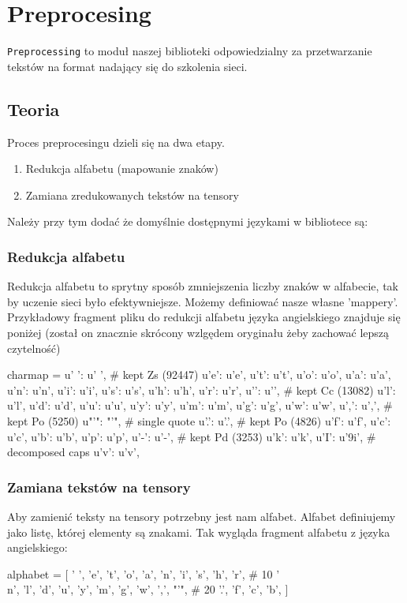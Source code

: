 \newpage
\section{Preprocesing}

\texttt{Preprocessing} to moduł naszej biblioteki odpowiedzialny za przetwarzanie tekstów na format
nadający się do szkolenia sieci. 

\subsection{Teoria}

Proces preprocesingu dzieli się na dwa etapy.
\begin{enumerate}
	\item Redukcja alfabetu (mapowanie znaków)
	\item Zamiana zredukowanych tekstów na tensory
\end{enumerate}

Należy przy tym dodać że domyślnie dostępnymi językami w bibliotece są:
\languages 


\subsubsection{Redukcja alfabetu}
Redukcja alfabetu to sprytny sposób zmniejszenia liczby znaków w alfabecie, tak by uczenie sieci było
efektywniejsze. Możemy definiować nasze własne 'mappery'. Przykładowy fragment pliku do redukcji alfabetu języka
angielskiego znajduje się poniżej (został on znacznie skrócony wzlgędem oryginału żeby zachować lepszą
czytelność)

\begin{python}
charmap = {
    u' ': u' ',                 # kept Zs (92447)
    u'e': u'e',
    u't': u't',
    u'o': u'o',
    u'a': u'a',
    u'n': u'n',
    u'i': u'i',
    u's': u's',
    u'h': u'h',
    u'r': u'r',
    u'\n': u'\n',               # kept Cc (13082)
    u'l': u'l',
    u'd': u'd',
    u'u': u'u',
    u'y': u'y',
    u'm': u'm',
    u'g': u'g',
    u'w': u'w',
    u',': u',',                 # kept Po (5250)
    u"'": "'",                  # single quote
    u'.': u'.',                 # kept Po (4826)
    u'f': u'f',
    u'c': u'c',
    u'b': u'b',
    u'p': u'p',
    u'-': u'-',                 # kept Pd (3253)
    u'k': u'k',
    u'I': u'\xb9i',             # decomposed caps
    u'v': u'v',
}
\end{python}

\newpage
\subsubsection{Zamiana tekstów na tensory}
Aby zamienić teksty na tensory potrzebny jest nam alfabet. Alfabet definiujemy jako listę, której 
elementy są znakami. Tak wygląda fragment alfabetu z języka angielskiego:
\begin{python}
alphabet = [
    ' ',
    'e',
    't',
    'o',
    'a',
    'n',
    'i',
    's',
    'h',
    'r',  # 10
    '\\n',
    'l',
    'd',
    'u',
    'y',
    'm',
    'g',
    'w',
    ',',
    "'",  # 20
    '.',
    'f',
    'c',
    'b',
]
\end{python}

